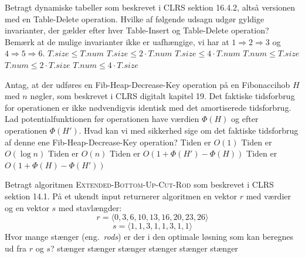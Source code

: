\sideskift

Betragt dynamiske tabeller som beskrevet i CLRS sektion 16.4.2, altså versionen med en {\sc Table-Delete} operation.
Hvilke af følgende udsagn udgør gyldige invarianter, der gælder efter hver {\sc Table-Insert} og {\sc Table-Delete} operation?
Bemærk at de mulige invarianter ikke er uafhængige, vi har at $1 \Rightarrow 2 \Rightarrow 3$ og $4 \Rightarrow 5 \Rightarrow 6$.
\fleresvar
\mulighederstart
\svar $T.size \leq T.num$
\svar $T.size \leq 2\cdot T.num$
\svar $T.size \leq 4\cdot T.num$ \korrekt
\svar $T.num \leq T.size$ \korrekt
\svar $T.num \leq 2\cdot T.size$ \korrekt
\svar $T.num \leq 4\cdot T.size$ \korrekt
\mulighederslut
{}

Antag, at der udføres en {\sc Fib-Heap-Decrease-Key} operation på en Fibonaccihob $H$ med $n$ nøgler, som beskrevet i CLRS digitalt kapitel 19.
Det faktiske tidsforbrug for operationen er ikke nødvendigvis identisk med det amortiserede tidsforbrug.
Lad potentialfunktionen før operationen have værdien $\Phi(H)$ og efter operationen $\Phi(H')$.
Hvad kan vi med sikkerhed sige om det faktiske tidsforbrug af denne ene {\sc Fib-Heap-Decrease-Key} operation?
\fleresvar
\mulighederstart
\svar Tiden er $O(1)$
\svar Tiden er $O(\log n)$
\svar Tiden er $O(n)$ \korrekt
\svar Tiden er $O(1 + \Phi(H') - \Phi(H))$
\svar Tiden er $O(1 + \Phi(H) - \Phi(H'))$ \korrekt
\mulighederslut
{}

Betragt algoritmen \textsc{Extended-Bottom-Up-Cut-Rod} som beskrevet i CLRS sektion 14.1.
På et ukendt input returnerer algoritmen en vektor $r$ med værdier og en vektor $s$ med stavlængder:
\[
r=\langle 0, 3, 6, 10, 13, 16, 20, 23, 26\rangle
\]
\[
s=\langle 1, 1, 3, 1, 1, 3, 1, 1 \rangle
\]
Hvor mange stænger (eng.~\emph{rods}) er der i den optimale løsning som kan beregnes ud fra $r$ og $s$?
\etsvar
\mulighederstart
{} stænger
 stænger
 stænger \korrekt
{} stænger
 stænger
 stænger
\mulighederslut
{}

